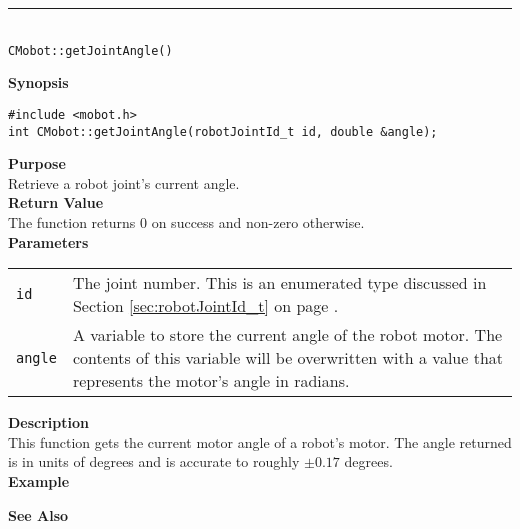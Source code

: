 \noindent
\vspace{5pt}
\rule{4.5in}{0.015in}\\
\noindent
{\LARGE \texttt{CMobot::getJointAngle()}}\\
{}

\noindent
{\bf Synopsis}
\vspace{-8pt}
\begin{verbatim}
#include <mobot.h>
int CMobot::getJointAngle(robotJointId_t id, double &angle);
\end{verbatim}

\noindent
{\bf Purpose}\\
Retrieve a robot joint's current angle.\\

\noindent
{\bf Return Value}\\
The function returns 0 on success and non-zero otherwise.\\

\noindent
{\bf Parameters}\\
\vspace{-0.1in}
\begin{description}
\item               
\begin{tabular}{p{15 mm}p{145 mm}}
\texttt{id} & The joint number. This is an enumerated type 
discussed in Section \ref{sec:robotJointId_t} on page
\pageref{sec:robotJointId_t}.\\
\texttt{angle} & A variable to store the current angle of the robot
motor. The contents of this variable will be overwritten with a value that
represents the motor's angle in radians.  \\
\end{tabular}
\end{description}

\noindent
{\bf Description}\\
This function gets the current motor angle of a robot's motor. The
angle returned is in units of degrees and is accurate to roughly $\pm0.17$
degrees. \\

\noindent
{\bf Example}\\
\noindent

\noindent
{\bf See Also}\\

